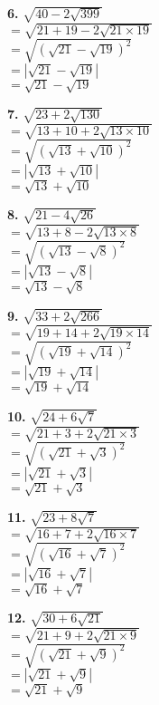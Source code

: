 \documentclass[a4paper,11pt]{article}
\newcommand{\explanationbox}[2][]{%
  \begin{tcolorbox}[explanationstyle, #1]
    #2
  \end{tcolorbox}
}
\begin{document}
\begin{multicols}{2}
\explanationbox{\textbf{6.} $\sqrt{40 - 2\sqrt{399}}$\\[0.3em]$= \sqrt{21+19 - 2\sqrt{21 \times 19}}$\\[0.3em]$= \sqrt{(\sqrt{21} - \sqrt{19})^2}$\\[0.3em]$= |\sqrt{21} - \sqrt{19}|$\\[0.3em]$= \sqrt{21} - \sqrt{19}$}

\explanationbox{\textbf{7.} $\sqrt{23 + 2\sqrt{130}}$\\[0.3em]$= \sqrt{13+10 + 2\sqrt{13 \times 10}}$\\[0.3em]$= \sqrt{(\sqrt{13} + \sqrt{10})^2}$\\[0.3em]$= |\sqrt{13} + \sqrt{10}|$\\[0.3em]$= \sqrt{13} + \sqrt{10}$}

\explanationbox{\textbf{8.} $\sqrt{21 - 4\sqrt{26}}$\\[0.3em]$= \sqrt{13+8 - 2\sqrt{13 \times 8}}$\\[0.3em]$= \sqrt{(\sqrt{13} - \sqrt{8})^2}$\\[0.3em]$= |\sqrt{13} - \sqrt{8}|$\\[0.3em]$= \sqrt{13} - \sqrt{8}$}

\explanationbox{\textbf{9.} $\sqrt{33 + 2\sqrt{266}}$\\[0.3em]$= \sqrt{19+14 + 2\sqrt{19 \times 14}}$\\[0.3em]$= \sqrt{(\sqrt{19} + \sqrt{14})^2}$\\[0.3em]$= |\sqrt{19} + \sqrt{14}|$\\[0.3em]$= \sqrt{19} + \sqrt{14}$}

\explanationbox{\textbf{10.} $\sqrt{24 + 6\sqrt{7}}$\\[0.3em]$= \sqrt{21+3 + 2\sqrt{21 \times 3}}$\\[0.3em]$= \sqrt{(\sqrt{21} + \sqrt{3})^2}$\\[0.3em]$= |\sqrt{21} + \sqrt{3}|$\\[0.3em]$= \sqrt{21} + \sqrt{3}$}

\explanationbox{\textbf{11.} $\sqrt{23 + 8\sqrt{7}}$\\[0.3em]$= \sqrt{16+7 + 2\sqrt{16 \times 7}}$\\[0.3em]$= \sqrt{(\sqrt{16} + \sqrt{7})^2}$\\[0.3em]$= |\sqrt{16} + \sqrt{7}|$\\[0.3em]$= \sqrt{16} + \sqrt{7}$}

\explanationbox{\textbf{12.} $\sqrt{30 + 6\sqrt{21}}$\\[0.3em]$= \sqrt{21+9 + 2\sqrt{21 \times 9}}$\\[0.3em]$= \sqrt{(\sqrt{21} + \sqrt{9})^2}$\\[0.3em]$= |\sqrt{21} + \sqrt{9}|$\\[0.3em]$= \sqrt{21} + \sqrt{9}$}


\end{multicols}
\end{document}

